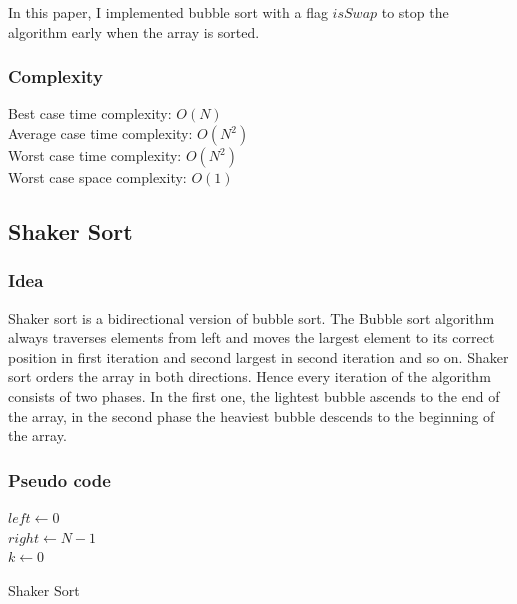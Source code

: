 \documentclass[11pt,a4paper]{article}
\begin{document}
In this paper, I implemented bubble sort with a flag $isSwap$ to stop the algorithm early
when the array is sorted.

\subsubsection*{Complexity}
Best case time complexity: $O(N)$ \\
Average case time complexity: $O(N^2)$\\
Worst case time complexity: $O(N^2)$ \\
Worst case space complexity: $O(1)$

\subsection{Shaker Sort}
\subsubsection*{Idea}
Shaker sort is a bidirectional version of bubble sort.
The Bubble sort algorithm always traverses elements from left and moves the largest 
element to its correct position in first iteration and second largest in second iteration and so on.
Shaker sort orders the array in both directions. Hence every iteration of the algorithm consists of two phases. 
In the first one, the lightest bubble ascends to the end of the array, in the second phase the heaviest bubble descends to the beginning of the array.

\subsubsection*{Pseudo code}
\begin{algorithm2e}
  \SetAlgoLined
  $left \gets 0$ \\
  $right \gets N-1$ \\
  $k \gets 0$\\
  \caption{Shaker Sort}
\end{algorithm2e}
\end{document}
